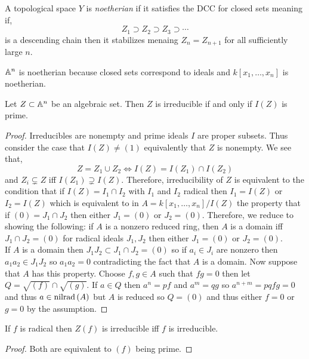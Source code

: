 \documentclass[12pt]{article}
\begin{document}
\begin{defn}
A topological space $Y$ is \textit{noetherian} if it satisfies the DCC for closed sets meaning if,
\[ Z_1 \supset Z_2 \supset Z_3 \supset \cdots \]
is a descending chain then it stabilizes menaing $Z_n = Z_{n + 1}$ for all sufficiently large $n$.
\end{defn}

\begin{example}
$\mathbb{A}^n$ is noetherian because closed sets correspond to ideals and $k[x_1, \dots, x_n]$ is noetherian.
\end{example}

\begin{prop}
Let $Z \subset \mathbb{A}^n$ be an algebraic set. Then $Z$ is irreducible if and only if $I(Z)$ is prime.
\end{prop}

\begin{proof}
Irreducibles are nonempty and prime ideals $I$ are proper subsets. Thus consider the case that $I(Z) \neq (1)$ equivalently that $Z$ is nonempty. We see that,
\[ Z = Z_1 \cup Z_2 \iff I(Z) = I(Z_1) \cap I(Z_2) \]
and $Z_i \subsetneq Z$ iff $I(Z_1) \supsetneq I(Z)$. Therefore, irreducibility of $Z$ is equivalent to the condition that if $I(Z) = I_1 \cap I_2$ with $I_1$ and $I_2$ radical then $I_1 = I(Z)$ or $I_2 = I(Z)$ which is equivalent to in $A = k[x_1, \dots, x_n] / I(Z)$ the property that if $(0) = J_1 \cap J_2$ then either $J_1 = (0)$ or $J_2 = (0)$. Therefore, we reduce to showing the following: if $A$ is a nonzero reduced ring, then $A$ is a domain iff $J_1 \cap J_2 = (0)$ for radical ideals $J_1, J_2$ then either $J_1 = (0)$ or $J_2 = (0)$.
\bigskip\\
If $A$ is a domain then $J_1 J_2 \subset J_1 \cap J_2 = (0)$ so if $a_i \in J_i$ are nonzero then $a_1 a_2 \in J_1 J_2$ so $a_1 a_2 = 0$ contradicting the fact that $A$ is a domain. Now suppose that $A$ has this property. Choose $f,g \in A$ such that $fg = 0$ then let $Q = \sqrt{(f)} \cap \sqrt{(g)}$. If $a \in Q$ then $a^n = pf$ and $a^m = qg$ so $a^{n+m} = pq fg = 0$ and thus $a \in \mathrm{nilrad}\left( A \right)$ but $A$ is reduced so $Q = (0)$ and thus either $f = 0$ or $g = 0$ by the assumption.
\end{proof}

\begin{cor}
If $f$ is radical then $Z(f)$ is irreducible iff $f$ is irreducible.
\end{cor}

\begin{proof}
Both are equivalent to $(f)$ being prime.
\end{proof}
\end{document}

